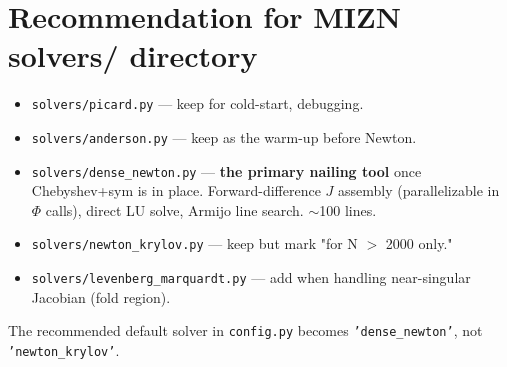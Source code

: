 \documentclass[11pt]{article}
\begin{document}
\section*{Recommendation for MIZN solvers/ directory}

\begin{itemize}
\item \texttt{solvers/picard.py} — keep for cold-start, debugging.
\item \texttt{solvers/anderson.py} — keep as the warm-up before Newton.
\item \texttt{solvers/dense\_newton.py} — \textbf{the primary nailing tool}
once Chebyshev+sym is in place. Forward-difference $J$ assembly (parallelizable
in $\Phi$ calls), direct LU solve, Armijo line search. $\sim$100 lines.
\item \texttt{solvers/newton\_krylov.py} — keep but mark "for N $>$ 2000 only."
\item \texttt{solvers/levenberg\_marquardt.py} — add when handling
near-singular Jacobian (fold region).
\end{itemize}

The recommended default solver in \texttt{config.py} becomes \texttt{'dense\_newton'},
not \texttt{'newton\_krylov'}.
\end{document}
